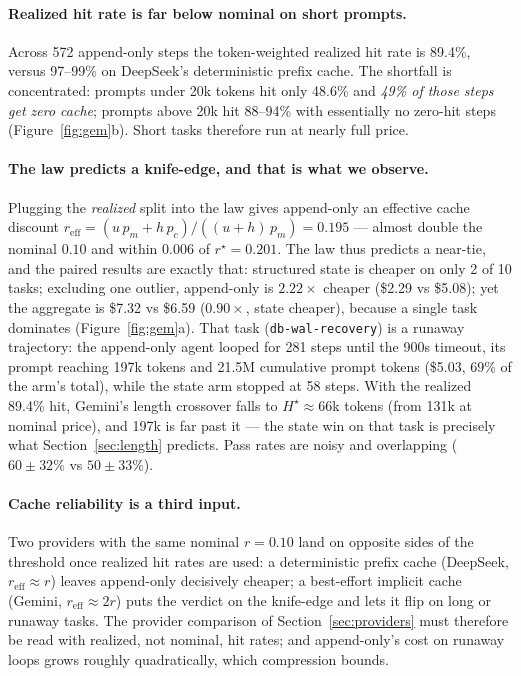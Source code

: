\documentclass[11pt]{article}
\begin{document}
\paragraph{Realized hit rate is far below nominal on short prompts.} Across 572
append-only steps the token-weighted realized hit rate is 89.4\%, versus
97--99\% on DeepSeek's deterministic prefix cache. The shortfall is concentrated:
prompts under 20k tokens hit only 48.6\% and \emph{49\% of those steps get zero
cache}; prompts above 20k hit 88--94\% with essentially no zero-hit steps
(Figure~\ref{fig:gem}b). Short tasks therefore run at nearly full price.

\paragraph{The law predicts a knife-edge, and that is what we observe.} Plugging
the \emph{realized} split into the law gives append-only an effective cache
discount $r_{\text{eff}} = (u\,p_m + h\,p_c)/((u{+}h)\,p_m) = 0.195$ --- almost
double the nominal $0.10$ and within $0.006$ of $r^\star=0.201$. The law thus
predicts a near-tie, and the paired results are exactly that: structured state
is cheaper on only 2 of 10 tasks; excluding one outlier, append-only is
$2.22\times$ cheaper (\$2.29 vs \$5.08); yet the aggregate is \$7.32 vs \$6.59
($0.90\times$, state cheaper), because a single task dominates
(Figure~\ref{fig:gem}a). That task (\texttt{db-wal-recovery}) is a runaway
trajectory: the append-only agent looped for 281 steps until the 900s timeout,
its prompt reaching 197k tokens and 21.5M cumulative prompt tokens (\$5.03, 69\%
of the arm's total), while the state arm stopped at 58 steps. With the realized
89.4\% hit, Gemini's length crossover falls to $H^\star\approx66$k tokens (from
131k at nominal price), and 197k is far past it --- the state win on that task
is precisely what Section~\ref{sec:length} predicts. Pass rates are noisy and
overlapping ($60\pm32\%$ vs $50\pm33\%$).

\paragraph{Cache reliability is a third input.} Two providers with the same
nominal $r=0.10$ land on opposite sides of the threshold once realized hit
rates are used: a deterministic prefix cache (DeepSeek, $r_{\text{eff}}\approx
r$) leaves append-only decisively cheaper; a best-effort implicit cache (Gemini,
$r_{\text{eff}}\approx 2r$) puts the verdict on the knife-edge and lets it flip
on long or runaway tasks. The provider comparison of Section~\ref{sec:providers}
must therefore be read with realized, not nominal, hit rates; and append-only's
cost on runaway loops grows roughly quadratically, which compression bounds.
\end{document}
